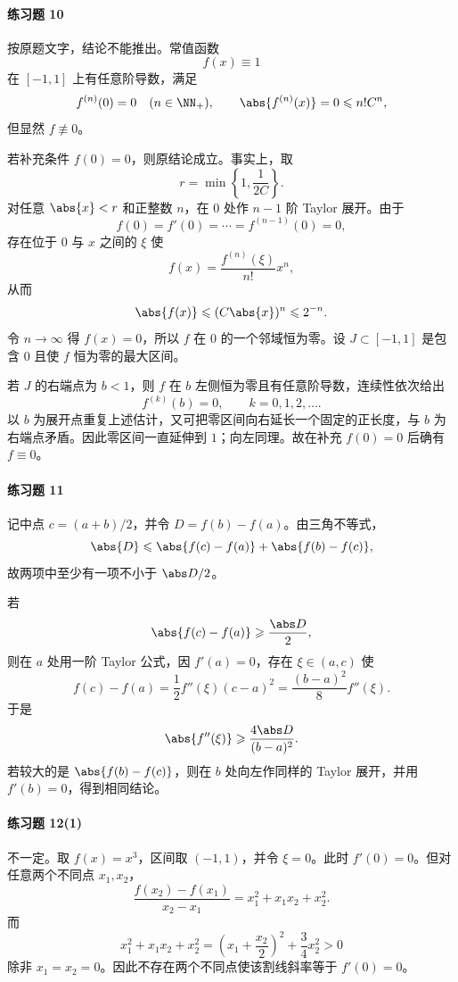 \paragraph{练习题 10}
\begin{xsolution}
按原题文字，结论不能推出。常值函数
\[
  f(x)\equiv1
\]
在 $[-1,1]$ 上有任意阶导数，满足
\[
  f^{(n)}(0)=0\quad(n\in\NN_+),
  \qquad
  \abs{f^{(n)}(x)}=0\leqslant n!C^n,
\]
但显然 $f\not\equiv0$。

若补充条件 $f(0)=0$，则原结论成立。事实上，取
\[
  r=\min\left\{1,\frac1{2C}\right\}.
\]
对任意 $\abs{x}<r$ 和正整数 $n$，在 $0$ 处作 $n-1$ 阶 Taylor 展开。由于
\[
  f(0)=f'(0)=\cdots=f^{(n-1)}(0)=0,
\]
存在位于 $0$ 与 $x$ 之间的 $\xi$ 使
\[
  f(x)=\frac{f^{(n)}(\xi)}{n!}x^n,
\]
从而
\[
  \abs{f(x)}\leqslant(C\abs{x})^n\leqslant2^{-n}.
\]
令 $n\to\infty$ 得 $f(x)=0$，所以 $f$ 在 $0$ 的一个邻域恒为零。设 $J\subset[-1,1]$ 是包含 $0$ 且使 $f$ 恒为零的最大区间。

若 $J$ 的右端点为 $b<1$，则 $f$ 在 $b$ 左侧恒为零且有任意阶导数，连续性依次给出
\[
  f^{(k)}(b)=0,\qquad k=0,1,2,\ldots.
\]
以 $b$ 为展开点重复上述估计，又可把零区间向右延长一个固定的正长度，与 $b$ 为右端点矛盾。因此零区间一直延伸到 $1$；向左同理。故在补充 $f(0)=0$ 后确有 $f\equiv0$。
\end{xsolution}

\paragraph{练习题 11}
\begin{xsolution}
记中点 $c=(a+b)/2$，并令 $D=f(b)-f(a)$。由三角不等式，
\[
  \abs{D}
  \leqslant\abs{f(c)-f(a)}+\abs{f(b)-f(c)},
\]
故两项中至少有一项不小于 $\abs D/2$。

若
\[
  \abs{f(c)-f(a)}\geqslant\frac{\abs D}{2},
\]
则在 $a$ 处用一阶 Taylor 公式，因 $f'(a)=0$，存在 $\xi\in(a,c)$ 使
\[
  f(c)-f(a)=\frac12f''(\xi)(c-a)^2
  =\frac{(b-a)^2}{8}f''(\xi).
\]
于是
\[
  \abs{f''(\xi)}
  \geqslant\frac{4\abs D}{(b-a)^2}.
\]
若较大的是 $\abs{f(b)-f(c)}$，则在 $b$ 处向左作同样的 Taylor 展开，并用 $f'(b)=0$，得到相同结论。
\end{xsolution}

\paragraph{练习题 12(1)}
\begin{xsolution}
不一定。取 $f(x)=x^3$，区间取 $(-1,1)$，并令 $\xi=0$。此时 $f'(0)=0$。但对任意两个不同点 $x_1,x_2$，
\[
  \frac{f(x_2)-f(x_1)}{x_2-x_1}
  =x_1^2+x_1x_2+x_2^2.
\]
而
\[
  x_1^2+x_1x_2+x_2^2
  =\left(x_1+\frac{x_2}{2}\right)^2+\frac34x_2^2>0
\]
除非 $x_1=x_2=0$。因此不存在两个不同点使该割线斜率等于 $f'(0)=0$。
\end{xsolution}

